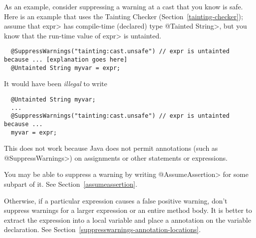 As an example, consider suppressing a warning at a cast that you know is
safe.  Here is an example that uses the Tainting Checker
(Section~\ref{tainting-checker}); assume that \<expr> has compile-time
(declared) type \<@Tainted String>, but you know that the run-time value of
\<expr> is untainted.

\begin{smaller}
\begin{Verbatim}
  @SuppressWarnings("tainting:cast.unsafe") // expr is untainted because ... [explanation goes here]
  @Untainted String myvar = expr;
\end{Verbatim}
\end{smaller}

\noindent
It would have been \emph{illegal} to write

\begin{smaller}
\begin{Verbatim}
  @Untainted String myvar;
  ...
  @SuppressWarnings("tainting:cast.unsafe") // expr is untainted because ...
  myvar = expr;
\end{Verbatim}
\end{smaller}

\noindent
This does not work because
Java does not permit annotations (such as \<@SuppressWarnings>) on
assignments or other statements or expressions.




You may be able to suppress a warning by writing
\<@AssumeAssertion> for some subpart of it.  See Section~\ref{assumeassertion}.

Otherwise, if a particular expression causes a false positive warning,
don't suppress warnings for a larger expression or an entire method body.
It is better to extract the expression into a local variable
and place a  annotation on the variable
declaration.  See Section~\ref{suppresswarnings-annotation-locations}.



